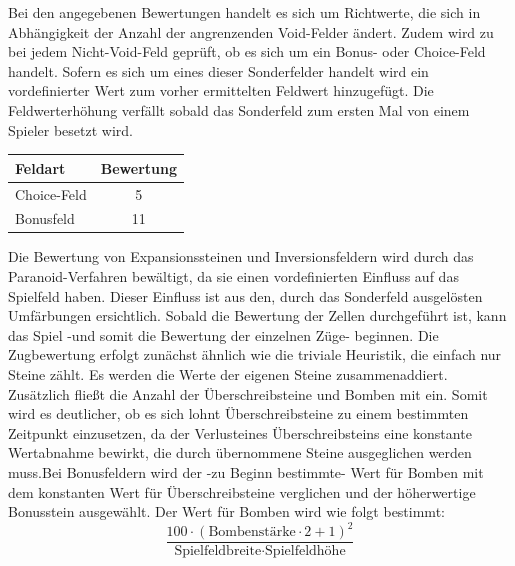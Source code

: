 \documentclass[12pt,a4paper]{article}
\begin{document}
Bei den angegebenen Bewertungen handelt es sich um Richtwerte, die sich in Abhängigkeit der Anzahl der angrenzenden Void-Felder ändert.\newline
Zudem wird zu bei jedem Nicht-Void-Feld geprüft, ob es sich um ein Bonus- oder Choice-Feld handelt. Sofern es sich um eines dieser Sonderfelder handelt wird ein vordefinierter Wert zum vorher ermittelten Feldwert hinzugefügt. Die Feldwerterhöhung verfällt sobald das Sonderfeld zum ersten Mal von einem Spieler besetzt wird.\newline
\begin{tabular}{|l|c|}
	\hline
	Feldart & Bewertung\\
	\hline
	Choice-Feld & 5\\
	\hline
	Bonusfeld & 11\\
	\hline
\end{tabular}

Die Bewertung von Expansionssteinen und Inversionsfeldern wird durch das Paranoid-Verfahren bewältigt, da sie einen vordefinierten Einfluss auf das Spielfeld haben. Dieser Einfluss ist aus den, durch das Sonderfeld ausgelösten Umfärbungen ersichtlich.
\newpage
Sobald die Bewertung der Zellen durchgeführt ist, kann das Spiel -und somit die Bewertung der einzelnen Züge- beginnen. Die Zugbewertung erfolgt zunächst ähnlich wie die triviale Heuristik, die einfach nur Steine zählt. Es werden die Werte der eigenen Steine zusammenaddiert. Zusätzlich fließt die Anzahl der Überschreibsteine und Bomben mit ein. Somit wird es deutlicher, ob es sich lohnt Überschreibsteine zu einem bestimmten Zeitpunkt einzusetzen, da der \glqq Verlust\grqq eines Überschreibsteins eine konstante Wertabnahme bewirkt, die durch übernommene Steine ausgeglichen werden muss.\newline Bei Bonusfeldern wird der -zu Beginn bestimmte- Wert für Bomben mit dem konstanten Wert für Überschreibsteine verglichen und der höherwertige Bonusstein ausgewählt. Der Wert für Bomben wird wie folgt bestimmt:\newline
\begin{equation*}
	\frac{100 \cdot (\text{Bombenstärke} \cdot 2 + 1)^2}{\text{Spielfeldbreite} \cdot \text{Spielfeldhöhe}}
\end{equation*}
\newline
\newpage
\end{document}
